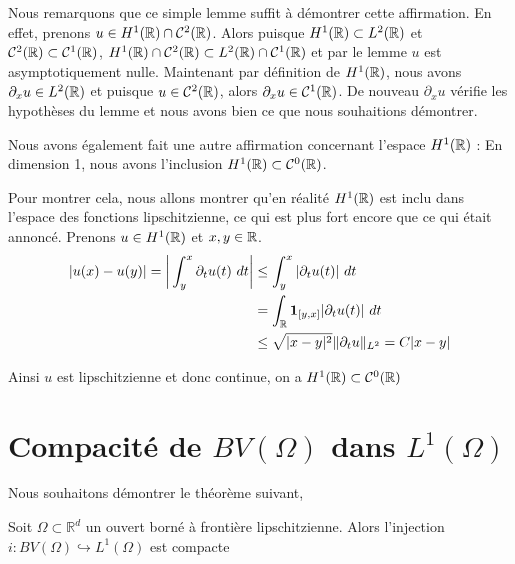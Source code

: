 Nous remarquons que ce simple lemme suffit à démontrer cette affirmation. En effet, prenons $u \in H^1(\mathbb{R})\cap\mathcal{C}^2(\mathbb{R})$.
Alors puisque $H^1(\mathbb{R}) \subset L^2(\mathbb{R})$ et $\mathcal{C}^2(\mathbb{R}) \subset \mathcal{C}^1(\mathbb{R})$, $H^1(\mathbb{R})\cap\mathcal{C}^2(\mathbb{R}) \subset L^2(\mathbb{R}) \cap \mathcal{C}^1(\mathbb{R})$ et par le lemme $u$ est asymptotiquement nulle.
Maintenant par définition de $H^1(\mathbb{R})$, nous avons $\partial_x u \in L^2(\mathbb{R})$ et puisque $u \in \mathcal{C}^2(\mathbb{R})$, alors $\partial_x u \in \mathcal{C}^1(\mathbb{R})$. De nouveau $\partial_x u$ vérifie les hypothèses du lemme et nous avons bien ce que nous souhaitions démontrer.

\vspace{1em}

Nous avons également fait une autre affirmation concernant l'espace $H^1(\mathbb{R})$ : En dimension 1, nous avons l'inclusion $H^1(\mathbb{R}) \subset \mathcal{C}^0(\mathbb{R})$.

Pour montrer cela, nous allons montrer qu'en réalité $H^1(\mathbb{R})$ est inclu dans l'espace des fonctions lipschitzienne, ce qui est plus fort encore que ce qui était annoncé.
Prenons $u \in H^1(\mathbb{R})$ et $x,y \in \mathbb{R}$.
\begin{equation*}
\begin{split}
    |u(x) - u(y)| = \bigg| \int_y^x \partial_t u(t) \ dt \bigg| &\leq \int_y^x |\partial_t u(t)| \ dt \\
    &= \int_{\mathbb{R}} \mathbf{1}_{[y,x]} |\partial_t u(t)| \ dt \\
    &\leq \sqrt{|x - y|^2} \| \partial_t u \|_{L^2} = C |x - y|
\end{split}
\end{equation*}

Ainsi $u$ est lipschitzienne et donc continue, on a $H^1(\mathbb{R}) \subset \mathcal{C}^0(\mathbb{R})$

\chapter{Compacité de $BV(\Omega)$ dans $L^1(\Omega)$}

Nous souhaitons démontrer le théorème suivant, 

\begin{theorembox}
\begin{theorem}
    Soit $\Omega \subset \mathbb{R}^d$ un ouvert borné à frontière lipschitzienne.
    Alors l'injection $i : BV(\Omega) \hookrightarrow L^1(\Omega)$ est compacte
\end{theorem}
\end{theorembox}

